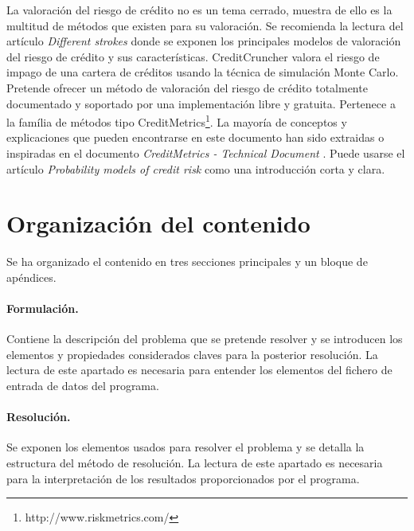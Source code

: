 La valoraci\'on del riesgo de cr\'edito no es un tema cerrado, muestra de ello 
es la multitud de m\'etodos que existen para su valoraci\'on. Se recomienda la 
lectura del art\'iculo \emph{Different strokes} \cite{Risk:Dif_Str} donde se 
exponen los principales modelos de valoraci\'on del riesgo de cr\'edito y sus 
caracter\'isticas. 
\newline
\newline
CreditCruncher valora el riesgo de impago de una cartera de cr\'editos usando la 
t\'ecnica de simulaci\'on Monte Carlo. Pretende ofrecer un m\'etodo de valoraci\'on 
del riesgo de cr\'edito totalmente documentado y soportado por una implementaci\'on 
libre y gratuita. Pertenece a la fam\'ilia de m\'etodos tipo 
CreditMetrics\footnote{http://www.riskmetrics.com/}.
\newline
\newline
La mayor\'ia de conceptos y explicaciones que pueden 
encontrarse en este documento han sido extraidas o inspiradas en el documento 
\emph{CreditMetrics - Technical Document} \cite{CreditMetrics:Tech_Doc}.
Puede usarse el art\'iculo \emph{Probability models of credit risk} \cite{cbs:glasser} 
como una introducci\'on corta y clara.


\section{Organizaci\'on del contenido}

Se ha organizado el contenido en tres secciones principales y un bloque de
ap\'endices.

\paragraph{Formulaci\'on.} Contiene la descripci\'on del problema que se
pretende resolver y se introducen los elementos y propiedades considerados
claves para la posterior resoluci\'on. La lectura de este apartado es necesaria para
entender los elementos del fichero de entrada de datos del programa.

\paragraph{Resoluci\'on.} Se exponen los elementos usados para
resolver el problema y se detalla la estructura del m\'etodo de resoluci\'on.
La lectura de este apartado es necesaria para la interpretaci\'on de los 
resultados proporcionados por el programa.

